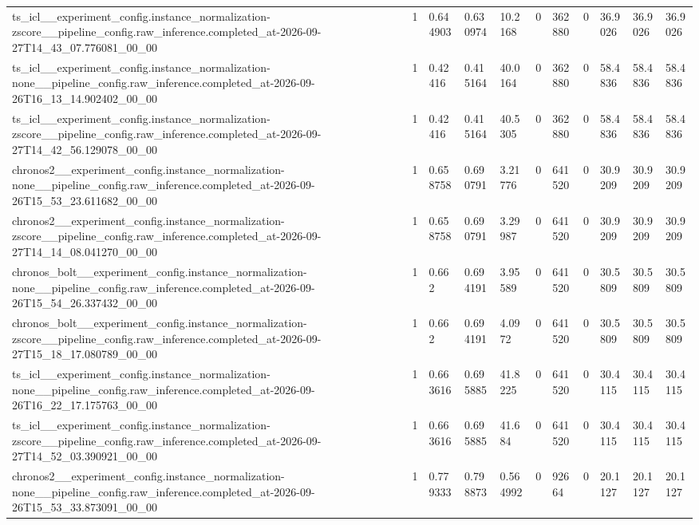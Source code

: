 \begin{tabular}{lllllllllll}
ts\_icl\_\_experiment\_config.instance\_normalization-zscore\_\_pipeline\_config.raw\_inference.completed\_at-2026-09-27T14\_43\_07.776081\_00\_00 & 1 & 0.644903 & 0.630974 & 10.2168 & 0 & 362880 & 0 & 36.9026 & 36.9026 & 36.9026 \\
ts\_icl\_\_experiment\_config.instance\_normalization-none\_\_pipeline\_config.raw\_inference.completed\_at-2026-09-26T16\_13\_14.902402\_00\_00 & 1 & 0.42416 & 0.415164 & 40.0164 & 0 & 362880 & 0 & 58.4836 & 58.4836 & 58.4836 \\
ts\_icl\_\_experiment\_config.instance\_normalization-zscore\_\_pipeline\_config.raw\_inference.completed\_at-2026-09-27T14\_42\_56.129078\_00\_00 & 1 & 0.42416 & 0.415164 & 40.5305 & 0 & 362880 & 0 & 58.4836 & 58.4836 & 58.4836 \\
chronos2\_\_experiment\_config.instance\_normalization-none\_\_pipeline\_config.raw\_inference.completed\_at-2026-09-26T15\_53\_23.611682\_00\_00 & 1 & 0.658758 & 0.690791 & 3.21776 & 0 & 641520 & 0 & 30.9209 & 30.9209 & 30.9209 \\
chronos2\_\_experiment\_config.instance\_normalization-zscore\_\_pipeline\_config.raw\_inference.completed\_at-2026-09-27T14\_14\_08.041270\_00\_00 & 1 & 0.658758 & 0.690791 & 3.29987 & 0 & 641520 & 0 & 30.9209 & 30.9209 & 30.9209 \\
chronos\_bolt\_\_experiment\_config.instance\_normalization-none\_\_pipeline\_config.raw\_inference.completed\_at-2026-09-26T15\_54\_26.337432\_00\_00 & 1 & 0.662 & 0.694191 & 3.95589 & 0 & 641520 & 0 & 30.5809 & 30.5809 & 30.5809 \\
chronos\_bolt\_\_experiment\_config.instance\_normalization-zscore\_\_pipeline\_config.raw\_inference.completed\_at-2026-09-27T15\_18\_17.080789\_00\_00 & 1 & 0.662 & 0.694191 & 4.0972 & 0 & 641520 & 0 & 30.5809 & 30.5809 & 30.5809 \\
ts\_icl\_\_experiment\_config.instance\_normalization-none\_\_pipeline\_config.raw\_inference.completed\_at-2026-09-26T16\_22\_17.175763\_00\_00 & 1 & 0.663616 & 0.695885 & 41.8225 & 0 & 641520 & 0 & 30.4115 & 30.4115 & 30.4115 \\
ts\_icl\_\_experiment\_config.instance\_normalization-zscore\_\_pipeline\_config.raw\_inference.completed\_at-2026-09-27T14\_52\_03.390921\_00\_00 & 1 & 0.663616 & 0.695885 & 41.684 & 0 & 641520 & 0 & 30.4115 & 30.4115 & 30.4115 \\
chronos2\_\_experiment\_config.instance\_normalization-none\_\_pipeline\_config.raw\_inference.completed\_at-2026-09-26T15\_53\_33.873091\_00\_00 & 1 & 0.779333 & 0.798873 & 0.564992 & 0 & 92664 & 0 & 20.1127 & 20.1127 & 20.1127 \\

\end{tabular}
